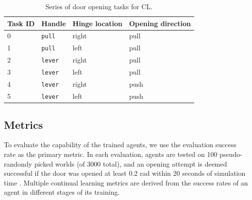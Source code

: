 \documentclass[dvipsnames]{article} %
\begin{document}
\begin{table}[htbp]
\caption{Series of door opening tasks for CL.}
\label{tab:tasksequence}
\begin{center}
\begin{tabular}{@{}llll@{}}
\toprule
Task ID & Handle & Hinge location & Opening direction \\ 
\midrule
0 & \texttt{pull}  & right & pull \\
1 & \texttt{pull}  & left  & pull \\
2 & \texttt{lever} & right & pull \\
3 & \texttt{lever} & left  & pull \\
4 & \texttt{lever} & right & push \\
5 & \texttt{lever} & left  & push \\
\bottomrule
\end{tabular}
\end{center}
\end{table}



\subsection{Metrics}
\label{chap:metrics}
To evaluate the capability of the trained agents, we use the evaluation success rate as the primary metric. In each evaluation, agents are tested on 100 pseudo-randomly picked worlds (of 3000 total), and an opening attempt is deemed successful if the door was opened at least 0.2 rad within 20 seconds of simulation time \citep{doorgym}. Multiple continual learning metrics are derived from the success rates of an agent in different stages of its training.
\end{document}
